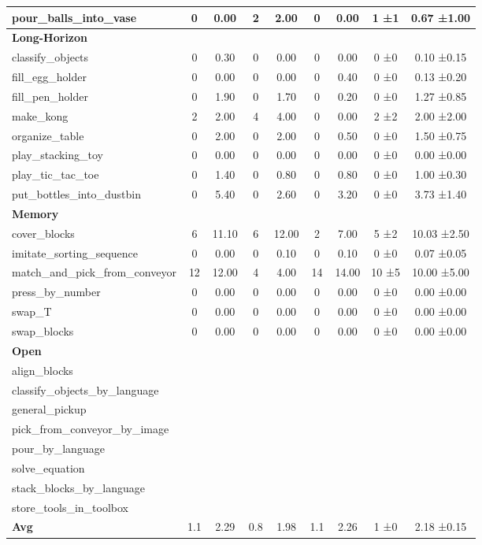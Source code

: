 \begin{table}[H]
{\begin{tabular}{l|c|c|c|c|c|c|c|c}
pour\_balls\_into\_vase & 0 & 0.00 & 2 & 2.00 & 0 & 0.00 & 1 ±1 & 0.67 ±1.00 \\
\hline
\multicolumn{9}{l}{\textbf{Long-Horizon}} \\
classify\_objects & 0 & 0.30 & 0 & 0.00 & 0 & 0.00 & 0 ±0 & 0.10 ±0.15 \\
fill\_egg\_holder & 0 & 0.00 & 0 & 0.00 & 0 & 0.40 & 0 ±0 & 0.13 ±0.20 \\
fill\_pen\_holder & 0 & 1.90 & 0 & 1.70 & 0 & 0.20 & 0 ±0 & 1.27 ±0.85 \\
make\_kong & 2 & 2.00 & 4 & 4.00 & 0 & 0.00 & 2 ±2 & 2.00 ±2.00 \\
organize\_table & 0 & 2.00 & 0 & 2.00 & 0 & 0.50 & 0 ±0 & 1.50 ±0.75 \\
play\_stacking\_toy & 0 & 0.00 & 0 & 0.00 & 0 & 0.00 & 0 ±0 & 0.00 ±0.00 \\
play\_tic\_tac\_toe & 0 & 1.40 & 0 & 0.80 & 0 & 0.80 & 0 ±0 & 1.00 ±0.30 \\
put\_bottles\_into\_dustbin & 0 & 5.40 & 0 & 2.60 & 0 & 3.20 & 0 ±0 & 3.73 ±1.40 \\
\hline
\multicolumn{9}{l}{\textbf{Memory}} \\
cover\_blocks & 6 & 11.10 & 6 & 12.00 & 2 & 7.00 & 5 ±2 & 10.03 ±2.50 \\
imitate\_sorting\_sequence & 0 & 0.00 & 0 & 0.10 & 0 & 0.10 & 0 ±0 & 0.07 ±0.05 \\
match\_and\_pick\_from\_conveyor & 12 & 12.00 & 4 & 4.00 & 14 & 14.00 & 10 ±5 & 10.00 ±5.00 \\
press\_by\_number & 0 & 0.00 & 0 & 0.00 & 0 & 0.00 & 0 ±0 & 0.00 ±0.00 \\
swap\_T & 0 & 0.00 & 0 & 0.00 & 0 & 0.00 & 0 ±0 & 0.00 ±0.00 \\
swap\_blocks & 0 & 0.00 & 0 & 0.00 & 0 & 0.00 & 0 ±0 & 0.00 ±0.00 \\
\hline
\multicolumn{9}{l}{\textbf{Open}} \\
align\_blocks &  &  &  &  &  &  &  &  \\
classify\_objects\_by\_language &  &  &  &  &  &  &  &  \\
general\_pickup &  &  &  &  &  &  &  &  \\
pick\_from\_conveyor\_by\_image &  &  &  &  &  &  &  &  \\
pour\_by\_language &  &  &  &  &  &  &  &  \\
solve\_equation &  &  &  &  &  &  &  &  \\
stack\_blocks\_by\_language &  &  &  &  &  &  &  &  \\
store\_tools\_in\_toolbox &  &  &  &  &  &  &  &  \\
\hline
\textbf{Avg} & 1.1 & 2.29 & 0.8 & 1.98 & 1.1 & 2.26 & 1 ±0 & 2.18 ±0.15 \\
\hline
\end{tabular}
}
\end{table}
